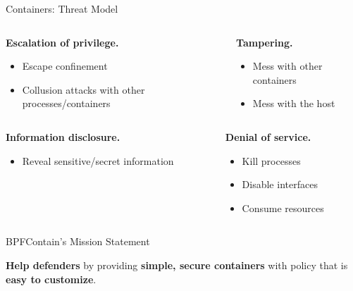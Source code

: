 \documentclass[12pt, dvipsnames, aspectratio=169]{beamer}
\newcommand\ufootnote[1]{%
    \begingroup
        \renewcommand\thefootnote{}\footnote{\hspace{-1.8em}#1}%
        \addtocounter{footnote}{-1}%
    \endgroup
}
\begin{document}
\begin{frame}[c]{Containers: Threat Model}
\begin{columns}
  \begin{column}[t]{0.4\textwidth}
    \textbf{Escalation of privilege.}
    \begin{itemize}
      \item Escape confinement
      \item Collusion attacks with other processes/containers
    \end{itemize}
    \vfill
  \end{column}
  \begin{column}[t]{0.4\textwidth}
    \textbf{Tampering.}
    \begin{itemize}
      \item Mess with other containers
      \item Mess with the host
    \end{itemize}
  \end{column}
\end{columns}
\vfill
\begin{columns}
  \begin{column}[t]{0.4\textwidth}
    \textbf{Information disclosure.}
    \begin{itemize}
      \item Reveal sensitive/secret information
    \end{itemize}
  \end{column}
  \begin{column}[t]{0.4\textwidth}
    \textbf{Denial of service.}
    \begin{itemize}
      \item Kill processes
      \item Disable interfaces
      \item Consume resources
    \end{itemize}
  \end{column}
\end{columns}
\end{frame}

\begin{frame}[c]{BPFContain's Mission Statement}
\begin{center}
\Huge
\textbf{Help defenders} by providing \textbf{simple, secure containers} with policy that is \textbf{easy to customize}.
\end{center}
\end{frame}

%
%
%
%
%
%
%
%
\end{document}
